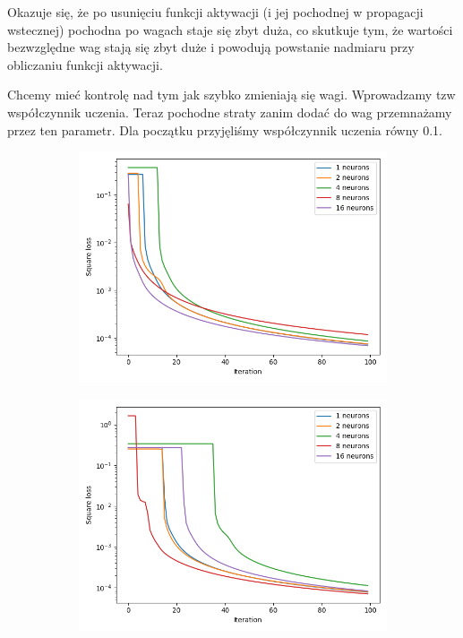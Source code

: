 \documentclass[12pt,a4paper]{article}
\begin{document}
Okazuje się, że po usunięciu funkcji aktywacji (i jej pochodnej w propagacji wstecznej) pochodna po wagach staje się zbyt duża, co skutkuje tym, że wartości bezwzględne wag stają się zbyt duże i powodują powstanie nadmiaru przy obliczaniu funkcji aktywacji.

Chcemy mieć kontrolę nad tym jak szybko zmieniają się wagi. Wprowadzamy tzw współczynnik uczenia. Teraz pochodne straty zanim dodać do wag przemnażamy przez ten parametr. Dla początku przyjęliśmy współczynnik uczenia równy 0.1.

\begin{figure}[h]
  \centering
\begin{subfigure}{0.5\textwidth}
  \includegraphics[width=\linewidth]{charts/no_output_activation/noactiv100iter_lr01_randw.png}
  \caption{}
  \label{}
\end{subfigure}\hfil
\begin{subfigure}{0.5\textwidth}
  \includegraphics[width=\linewidth]{charts/no_output_activation/noactiv100iter_lr01_randw2.png}
  \caption{}
  \label{}
\end{subfigure}


\end{figure}
\end{document}
